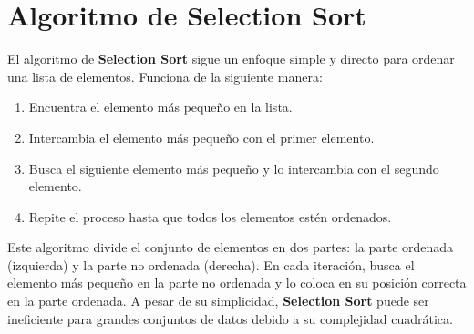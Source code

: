 \documentclass[12pt]{article}
\begin{document}
\section*{Algoritmo de Selection Sort}
\par\vspace{0.4cm}
El algoritmo de \textbf{Selection Sort} sigue un enfoque simple y directo para ordenar una lista de elementos. Funciona de la siguiente manera:
\par\vspace{0.4cm}
\begin{enumerate}
    \item Encuentra el elemento más pequeño en la lista.
    \item Intercambia el elemento más pequeño con el primer elemento.
    \item Busca el siguiente elemento más pequeño y lo intercambia con el segundo elemento.
    \item Repite el proceso hasta que todos los elementos estén ordenados.
\end{enumerate}
\par\vspace{0.4cm}
Este algoritmo divide el conjunto de elementos en dos partes: la parte ordenada (izquierda) y la parte no ordenada (derecha). En cada iteración, busca el elemento más pequeño en la parte no ordenada y lo coloca en su posición correcta en la parte ordenada. A pesar de su simplicidad, \textbf{Selection Sort} puede ser ineficiente para grandes conjuntos de datos debido a su complejidad cuadrática.
\par\vspace{0.4cm}
\end{document}
